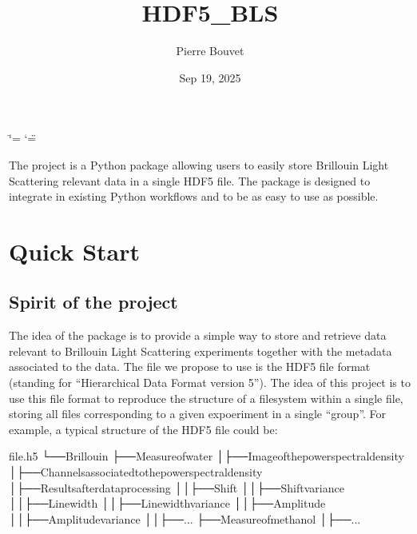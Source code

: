 \documentclass[letterpaper,10pt,english]{sphinxmanual}
\title{HDF5\_BLS}
\date{Sep 19, 2025}
\author{Pierre Bouvet}
\begin{document}
\ifdefined\shorthandoff
  \ifnum\catcode`\=\string=\active\shorthandoff{=}\fi
  \ifnum\catcode`\"=\active{}\fi
\fi

\pagestyle{empty}
\sphinxmaketitle
\pagestyle{plain}
\sphinxtableofcontents
\pagestyle{normal}
\label{\detokenize{index::doc}}


\sphinxAtStartPar
The  project is a Python package allowing users to easily store Brillouin Light Scattering relevant data in a single HDF5 file. The package is designed to integrate in existing Python workflows and to be as easy to use as possible.


\chapter{Quick Start}
\label{\detokenize{index:quick-start}}

\section{Spirit of the project}
\label{\detokenize{index:spirit-of-the-project}}
\sphinxAtStartPar
The idea of the package is to provide a simple way to store and retrieve data relevant to Brillouin Light Scattering experiments together with the metadata associated to the data. The file we propose to use is the HDF5 file format (standing for “Hierarchical Data Format version 5”). The idea of this project is to use this file format to reproduce the structure of a filesystem within a single file, storing all files corresponding to a given expoeriment in a single “group”. For example, a typical structure of the HDF5 file could be:

\begin{sphinxVerbatim}[commandchars=\\\{\}]
file.h5
└──Brillouin
├──Measureofwater
│├──Imageofthepowerspectraldensity
│├──Channelsassociatedtothepowerspectraldensity
│├──Resultsafterdataprocessing
││├──Shift
││├──Shiftvariance
││├──Linewidth
││├──Linewidthvariance
││├──Amplitude
││├──Amplitudevariance
││├──...
├──Measureofmethanol
│├──...
\end{sphinxVerbatim}
\end{document}
